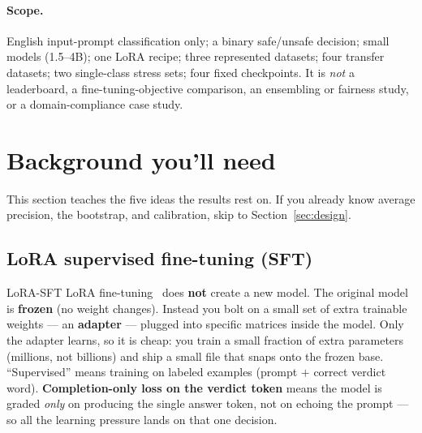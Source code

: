\documentclass[11pt]{article}
\begin{document}
\paragraph{Scope.} English input-prompt classification only; a binary safe/unsafe decision;
small models (1.5--4B); one LoRA recipe; three represented datasets; four transfer datasets;
two single-class stress sets; four fixed checkpoints. It is \emph{not} a leaderboard, a
fine-tuning-objective comparison, an ensembling or fairness study, or a domain-compliance
case study.

\section{Background you'll need}
This section teaches the five ideas the results rest on. If you already know average
precision, the bootstrap, and calibration, skip to Section~\ref{sec:design}.

\subsection{LoRA supervised fine-tuning (SFT)}
\begin{background}{LoRA-SFT}
\small
LoRA fine-tuning~\cite{hu2021lora} does \textbf{not} create a new model. The original model is \textbf{frozen}
(no weight changes). Instead you bolt on a small set of extra trainable weights --- an
\textbf{adapter} --- plugged into specific matrices inside the model. Only the adapter learns,
so it is cheap: you train a small fraction of extra parameters (millions, not billions) and
ship a small file that snaps onto the frozen base. ``Supervised'' means training on labeled
examples (prompt $+$ correct verdict word). \textbf{Completion-only loss on the verdict
token} means the model is graded \emph{only} on producing the single answer token, not on
echoing the prompt --- so all the learning pressure lands on that one decision.
\end{background}
\end{document}
